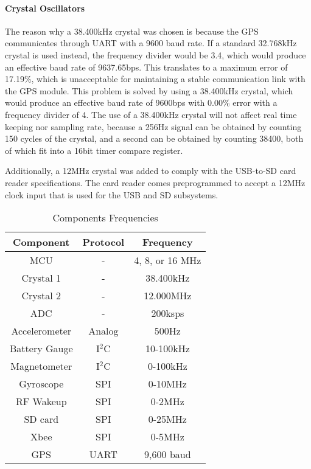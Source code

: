 \paragraph{Crystal Oscillators}
The reason why a 38.400kHz crystal was chosen is because the GPS communicates through UART with a 9600 baud rate. If a standard 32.768kHz crystal is used instead, the frequency divider would be 3.4, which would produce an effective baud rate of 9637.65bps. This translates to a maximum error of 17.19\%, which is unacceptable for maintaining a stable communication link with the GPS module. This problem is solved by using a 38.400kHz crystal, which would produce an effective baud rate of 9600bps with 0.00\% error with a frequency divider of 4. The use of a 38.400kHz crystal will not affect real time keeping nor sampling rate, because a 256Hz signal can be obtained by counting 150 cycles of the crystal, and a second can be obtained by counting 38400, both of which fit into a 16bit timer compare register.

Additionally, a 12MHz crystal was added to comply with the USB-to-SD card reader specifications. The card reader comes preprogrammed to accept a 12MHz clock input that is used for the USB and SD subsystems.

\begin{table}[H]
  \centering
  \caption{Components Frequencies}
    \begin{tabular}{|c|c|c|}
    \hline
    \rowcolor{Gray}
    Component & Protocol & Frequency \\
    \hline \hline
    MCU   & -     & 4, 8, or 16 MHz \\ \hline
    Crystal 1 & -     & 38.400kHz \\ \hline
    Crystal 2 & -     & 12.000MHz \\ \hline
    ADC   & -     & 200ksps \\ \hline
    Accelerometer & Analog & 500Hz \\ \hline
    Battery Gauge & I$^2$C & 10-100kHz \\ \hline
    Magnetometer & I$^2$C & 0-100kHz \\ \hline
    Gyroscope & SPI   & 0-10MHz \\ \hline
    RF Wakeup & SPI   & 0-2MHz \\ \hline
    SD card & SPI   & 0-25MHz \\ \hline
    Xbee  & SPI   & 0-5MHz \\ \hline
    GPS   & UART  & 9,600 baud \\ \hline
    \end{tabular}%
  \label{tab:compFreq}%
\end{table}%

